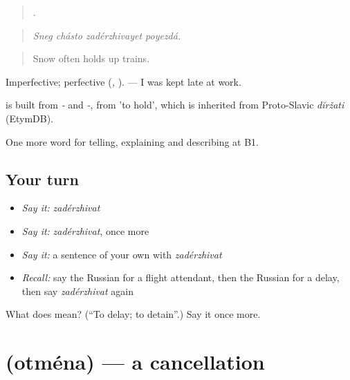 \begin{quote}
   .
\end{quote}

\begin{quote}
\emph{Sneg chásto zadérzhivayet poyezdá.}
\end{quote}

\begin{quote}
Snow often holds up trains.
\end{quote}

Imperfective; perfective \emph{} (\emph{, }). \emph{   } — I was kept late at work.

\begin{cousinweb}
\emph{} is built from \emph{-} and \emph{-}, from \emph{} 'to hold', which is inherited from Proto-Slavic \emph{dĭržati} (EtymDB).
\end{cousinweb}

\begin{grammarlens}[title={What you've built}]
One more word for telling, explaining and describing at B1.
\end{grammarlens}

\subsection*{Your turn}
\begin{itemize}
\raggedright
  \item \emph{Say it:} \emph{zadérzhivat}
  \item \emph{Say it:} \emph{zadérzhivat}, once more
  \item \emph{Say it:} a sentence of your own with \emph{zadérzhivat}
  \item \emph{Recall:} say the Russian for a flight attendant, then the Russian for a delay, then say \emph{zadérzhivat} again
\end{itemize}

\begin{tcolorbox}[breakable,colback=teal!4,colframe=teal!35!black,title={Before you move on}]
What does  mean? (\textquotedblleft{}To delay; to detain\textquotedblright{}.) Say it once more.
\end{tcolorbox}
\section[\texorpdfstring{\ru{отмена} (otména)}{отмена (otména)}]{ (otména) — a cancellation}

